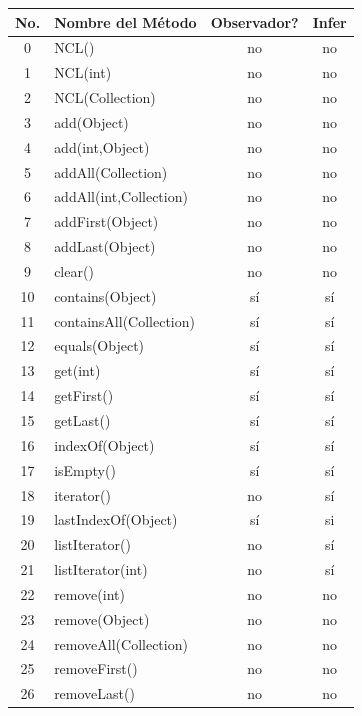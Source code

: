 \begin{table}[H]
\centering
\scriptsize
\begin{tabular}{clcc}
\toprule
No. & Nombre del Método & Observador? & Infer \\
\midrule
0  & NCL()                        & no  & no \\
1  & NCL(int)                     & no  & no \\
2  & NCL(Collection)              & no  & no \\
3  & add(Object)                  & no  & no \\
4  & add(int,Object)              & no  & no \\
5  & addAll(Collection)           & no  & no \\
6  & addAll(int,Collection)       & no  & no \\
7  & addFirst(Object)             & no  & no \\
8  & addLast(Object)              & no  & no \\
9  & clear()                      & no  & no \\
10 & contains(Object)             & sí  & sí \\
11 & containsAll(Collection)      & sí  & sí \\
12 & equals(Object)               & sí  & sí \\
13 & get(int)                     & sí  & sí \\
14 & getFirst()                   & sí  & sí \\
15 & getLast()                    & sí  & sí \\
16 & indexOf(Object)              & sí  & sí \\
17 & isEmpty()                    & sí  & sí \\
18 & iterator()                   & no  & sí \\
19 & lastIndexOf(Object)          & sí  & si \\
20 & listIterator()               & no  & sí \\
21 & listIterator(int)            & no  & sí \\
22 & remove(int)                  & no  & no \\
23 & remove(Object)               & no  & no \\
24 & removeAll(Collection)        & no  & no \\
25 & removeFirst()                & no  & no \\
26 & removeLast()                 & no  & no \\

\end{tabular}
\end{table}
